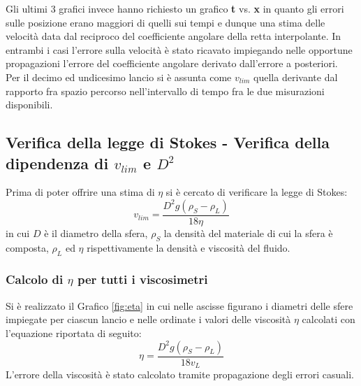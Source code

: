 \documentclass[a4paper,11pt,oneside]{article}
\begin{document}
Gli ultimi 3 grafici invece hanno richiesto un grafico \textbf{t} vs. \textbf{x} in quanto gli errori sulle posizione erano maggiori di quelli sui tempi e dunque una stima delle velocità data dal reciproco del coefficiente angolare della retta interpolante. In entrambi i casi l'errore sulla velocità è stato ricavato impiegando nelle opportune propagazioni l'errore del coefficiente angolare derivato dall'errore a posteriori.\\


Per il decimo ed undicesimo lancio si è assunta come $v_{lim}$ quella derivante dal rapporto fra spazio percorso nell'intervallo di tempo fra le due misurazioni disponibili. 


 



\subsection{Verifica della legge di Stokes - Verifica della dipendenza di $v_{lim}$ e $D^2$}
Prima di poter offrire una stima di $\eta$ si è cercato di verificare la legge di Stokes:
\begin{equation*}
    v_{lim}= \frac{{D}^2g\left(\rho_S - \rho_L\right)}{18 \eta }
\end{equation*}
in cui $D$ è il diametro della sfera, $\rho_S$ la densità del materiale di cui la sfera è composta, $\rho_L$ ed $\eta$ rispettivamente la densità e viscosità del fluido.

\subsubsection*{Calcolo di $\eta$ per tutti i viscosimetri}
Si è realizzato il Grafico \ref{fig:eta} in cui nelle ascisse figurano i diametri delle sfere impiegate per ciascun lancio e nelle ordinate i valori delle viscosità $\eta$ calcolati con l'equazione riportata di seguito:
\begin{equation*}
    \eta= \frac{{D}^2g\left(\rho_S - \rho_L\right)}{18 v_{L}} 
\end{equation*}
L'errore della viscosità è stato calcolato tramite propagazione degli errori casuali.
\end{document}
